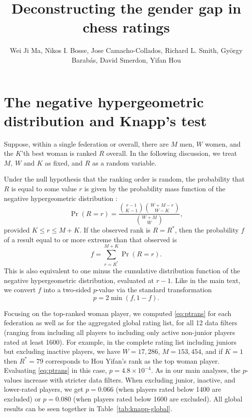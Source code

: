 \documentclass[9pt,twoside,lineno]{pnas-new}
\title{Deconstructing the gender gap in chess ratings}
\author{Wei Ji Ma, Nikos I. Bosse, Jose Camacho-Collados, Richard L. Smith, Gy\"orgy Barab\'as, David Smerdon, Yifan Hou}
\begin{document}
\maketitle
\SItext
\section*{The negative hypergeometric distribution and Knapp's test}
\medskip

Suppose, within a single federation or overall, there are $M$ men, $W$ women, and the $K$'th best woman is ranked $R$ overall. In the following discussion, we treat $M,\ W$ and $K$ as fixed, and $R$ as a random variable.

Under the null hypothesis that the ranking order is random, the probability that $R$ is equal to some value $r$ is given by the probability mass function of the negative hypergeometric distribution \cite{knapp2010prsb}:
\begin{equation}
  \Pr(R = r)
  = \frac{\binom{r - 1}{K - 1}
  \binom{W + M - r}{W - K}}{\binom{W + M}{W}} ,
  \label{eq:KT1}
\end{equation}
provided $K \le r \le M + K$. If the observed rank is $R=R^*$, then the probability $f$ of a result equal to or more extreme than that observed is 
\begin{equation}
  f = \sum_{r=R^*}^{M+K} \Pr(R = r) .
  \label{eq:KT2}
\end{equation}
This is also equivalent to one minus the cumulative distribution function of the negative hypergeometric distribution, evaluated at $r - 1$. Like in the main text, we convert $f$ into a two-sided $p$-value via the standard transformation
\begin{equation}
  p = 2\min(f, 1-f) .
  \label{eq:ptrans}
\end{equation}

Focusing on the top-ranked woman player, we computed \eqref{eq:ptrans} for each federation as well as for the aggregated global rating list, for all 12 data filters (ranging from including all players to including only active non-junior players rated at least 1600). For example, in the complete rating list including juniors but excluding inactive players, we have $W = 17,286$, $M = 153,454$, and if $K=1$ then $R^*=79$ corresponds to Hou Yifan's rank as the top woman player. Evaluating \eqref{eq:ptrans} in this case, $p = 4.8\times 10^{-4}$. As in our main analyses, the $p$-values increase with stricter data filters. When excluding junior, inactive, and lower-rated players, we get $p = 0.066$ (when players rated below 1400 are excluded) or $p = 0.080$ (when players rated below 1600 are excluded). All global results can be seen together in Table~\ref{tab:knapp-global}.
\end{document}
